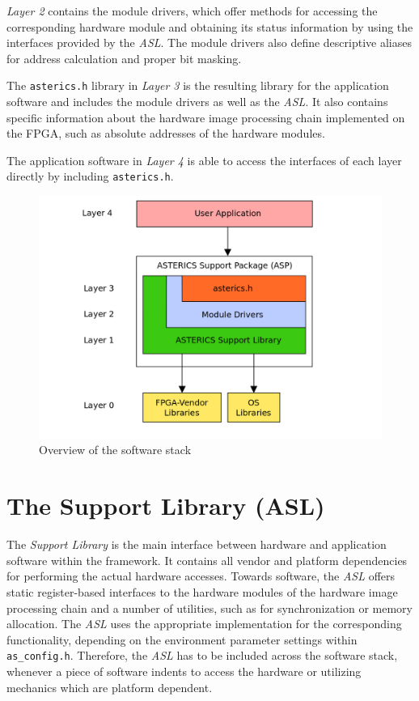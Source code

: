 \textit{Layer 2} contains the \asterics module drivers, which offer methods for accessing the corresponding hardware module and obtaining its status information by using the interfaces provided by the \textit{ASL}. 
The module drivers also define descriptive aliases for address calculation and proper bit masking. 

The \texttt{asterics.h} library in \textit{Layer 3} is the resulting library for the application software and includes the \asterics module drivers as well as  the \textit{ASL}.
It also contains specific information about the hardware image processing chain implemented on the FPGA, such as absolute addresses of the hardware modules.

The application software in \textit{Layer 4} is able to access the interfaces of each layer directly by including \texttt{asterics.h}.


\begin{figure}[ht]
    \centering
    \includegraphics[width=0.8\linewidth,clip]{figs/software_stack.png}
    \caption{Overview of the \asterics software stack}
    \label{fig:software-stack}
\end{figure}





\section{The \asterics Support Library (ASL)}



The \textit{\asterics Support Library} is the main interface between hardware and application software within the \asterics framework.
It contains all vendor and platform dependencies for performing the actual hardware accesses.
Towards software, the \textit{ASL} offers static register-based interfaces to the \asterics hardware modules of the hardware image processing chain and a number of utilities, such as for synchronization or memory allocation.
The \textit{ASL} uses the appropriate implementation for the corresponding functionality, depending on the environment parameter settings within \texttt{as\_config.h}.
Therefore, the \textit{ASL} has to be included across the \asterics software stack, whenever a piece of software indents to access the hardware or utilizing mechanics which are platform dependent.




